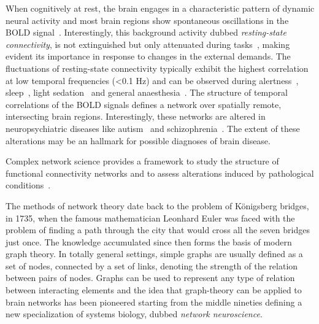 When cognitively at rest, the brain engages in a characteristic pattern of dynamic neural activity and most brain regions show spontaneous oscillations in the BOLD signal~\cite{biswal1995,raichle2001,gusnard2001}.
Interestingly, this background activity dubbed \emph{resting-state connectivity}, is not extinguished but only attenuated during tasks~\cite{fransson2006}, making evident its importance in response to changes in the external demands.
The fluctuations of resting-state connectivity typically exhibit the highest correlation at low temporal frequencies (<0.1 Hz) and can be observed during alertness~\cite{fox2006}, sleep~\cite{horovitz2009}, light sedation~\cite{greicius2008} and general anaesthesia~\cite{martuzzi2010}.
The structure of temporal correlations of the BOLD signals defines a network over spatially remote, intersecting brain regions. 
Interestingly, these networks are altered in neuropsychiatric diseases like autism~\cite{rudie2013} and schizophrenia~\cite{vandenheuvel2014}.
The extent of these alterations may be an hallmark for possible diagnoses of brain disease.

Complex network science provides a framework to study the structure of functional connectivity networks and to assess alterations induced by pathological conditions~\cite{bullmore2009,stam2014,crossley2014,fornito2015}.


The methods of network theory date back to the problem of K{\"o}nigsberg bridges, in 1735, when the famous mathematician Leonhard Euler was faced with the problem of finding a path through the city that would cross all the seven bridges just once.
The knowledge accumulated since then forms the basis of modern graph theory.
In totally general settings, simple graphs are usually defined as a set of nodes,  connected by a set of links, denoting the strength of the relation between pairs of nodes.
Graphs can be used to represent any type of relation between interacting elements and the idea that graph-theory can be applied to brain networks has been pioneered starting from the middle nineties defining a new specialization of systems biology, dubbed \emph{network neuroscience}.


